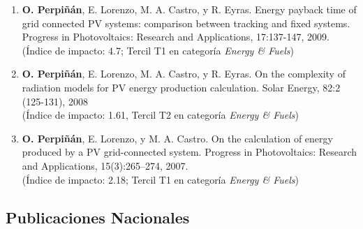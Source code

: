 \documentclass[article, a4paper]{memoir}
\begin{document}
\begin{enumerate}
\item \textbf{O. Perpiñán}, E. Lorenzo, M. A. Castro, y R. Eyras. Energy payback time of grid connected PV systems: comparison between tracking and fixed systems. Progress in Photovoltaics: Research and Applications, 17:137-147, 2009.\\ (Índice de impacto: 4.7; Tercil T1 en categoría \emph{Energy \& Fuels})

\item \textbf{O. Perpiñán}, E. Lorenzo, M. A. Castro, y R. Eyras. On the complexity of radiation models for PV energy production calculation. Solar Energy, 82:2 (125-131), 2008\\ (Índice de impacto: 1.61, Tercil T2 en categoría \emph{Energy \& Fuels})

\item \textbf{O. Perpiñán}, E. Lorenzo, y M. A. Castro. On the calculation of energy produced by a PV grid-connected system. Progress in Photovoltaics: Research and Applications, 15(3):265–274, 2007.\\ (Índice de impacto: 2.18; Tercil T1 en categoría \emph{Energy \& Fuels})
\end{enumerate}

\subsection{Publicaciones Nacionales}
\label{sec-7-2}
\end{document}
